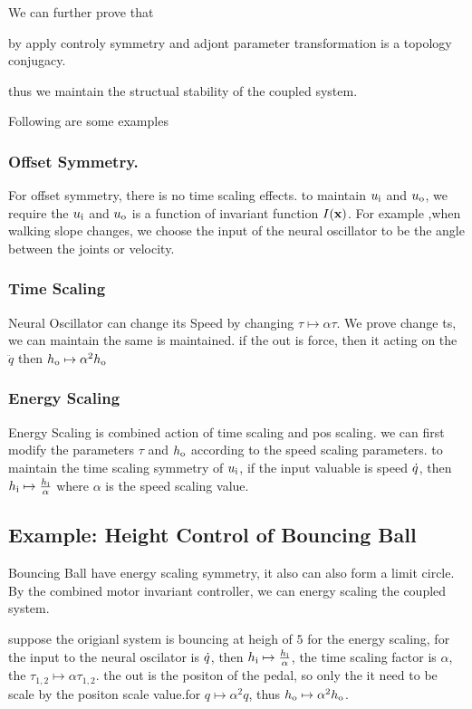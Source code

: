 We can further prove that
\begin{mythe}
by apply controly symmetry and adjont parameter transformation is a topology conjugacy.
\end{mythe}
thus we maintain the structual stability of the coupled system.

Following are some examples


\subsubsection*{ Offset Symmetry.}
For offset symmetry, there is no time scaling effects.
to maintain $u_{\mathrm{i}}$ and $u_{\mathrm{o}}$, we require the $u_{\mathrm{i}}$ and $u_{\mathrm{o}}$ is a function of invariant function $I(\mathbf{x})$.
For example ,when walking slope changes, we choose the input of the neural oscillator to be the angle between the joints or velocity.



\subsubsection*{Time Scaling}
Neural Oscillator can change its Speed by changing $\tau \mapsto \alpha \tau $.
We prove change ts, we can maintain the same is maintained.
if the out is force, then it acting on the $\ddot{q}$
then $h_{\mathrm{o}} \mapsto \alpha^2 h_{\mathrm{o}}$

\subsubsection*{ Energy Scaling}
Energy Scaling is combined action of time scaling and pos scaling.
we can first modify the parameters $\tau$ and $h_{\mathrm{o}}$ according to the speed scaling parameters.
to maintain the time scaling symmetry of $u_{\mathrm{i}}$, if the input valuable is speed $\dot{q}$, 
then $h_{\mathrm{i}} \mapsto \frac{h_{\mathrm{i}}}{\alpha}$ where $\alpha$ is the speed scaling value.




\subsection{Example: Height Control of Bouncing Ball}

Bouncing Ball have energy scaling symmetry, it also can also form a limit circle.
By the combined motor invariant controller, we can energy scaling the coupled system.

suppose the origianl system is bouncing at heigh of $5$
for the energy scaling, for the input to the neural oscilator is $\dot{q}$,
then $h_{\mathrm{i}} \mapsto \frac{h_{\mathrm{i}}}{\alpha}$, the time scaling factor is $\alpha$, the $\tau_{1,2} \mapsto \alpha \tau_{1,2}$.
the out is the positon of the pedal, so only the it need to be scale by the positon scale value.for $q \mapsto \alpha^2q$,
thus $h_{\mathrm{o}} \mapsto \alpha^2 h_{\mathrm{o}}$.

